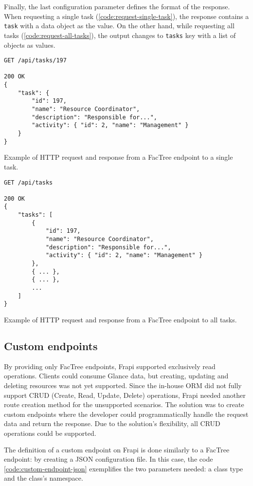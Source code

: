 Finally, the last configuration parameter defines the format of the response. When requesting a single task (\autoref{code:request-single-task}), the response contains a \texttt{task} with a data object as the value. On the other hand, while requesting all tasks (\autoref{code:request-all-tasks}), the output changes to \texttt{tasks} key with a list of objects as values.

\begin{listing}[htbp]
\begin{verbatim}
GET /api/tasks/197

200 OK
{
	"task": {
		"id": 197,
		"name": "Resource Coordinator",
		"description": "Responsible for...",
		"activity": { "id": 2, "name": "Management" }
	}
}
\end{verbatim}
\caption{Example of HTTP request and response from a FacTree endpoint to a single task.}
\label{code:request-single-task}
\end{listing}

\begin{listing}[htbp]
\begin{verbatim}
GET /api/tasks

200 OK
{
	"tasks": [
		{
			"id": 197,
			"name": "Resource Coordinator",
			"description": "Responsible for...",
			"activity": { "id": 2, "name": "Management" }
		},
		{ ... },
		{ ... },
		...
	]
}
\end{verbatim}
\caption{Example of HTTP request and response from a FacTree endpoint to all tasks.}
\label{code:request-all-tasks}
\end{listing}

\subsection{Custom endpoints}
\label{sec:custom-endpoints}

By providing only FacTree endpoints, Frapi supported exclusively read operations. Clients could consume Glance data, but creating, updating and deleting resources was not yet supported. Since the in-house ORM did not fully support CRUD (Create, Read, Update, Delete) operations, Frapi needed another route creation method for the unsupported scenarios. The solution was to create custom endpoints where the developer could programmatically handle the request data and return the response. Due to the solution's flexibility, all CRUD operations could be supported.

The definition of a custom endpoint on Frapi is done similarly to a FacTree endpoint: by creating a JSON configuration file. In this case, the code \autoref{code:custom-endpoint-json} exemplifies the two parameters needed: a class type and the class's namespace.

